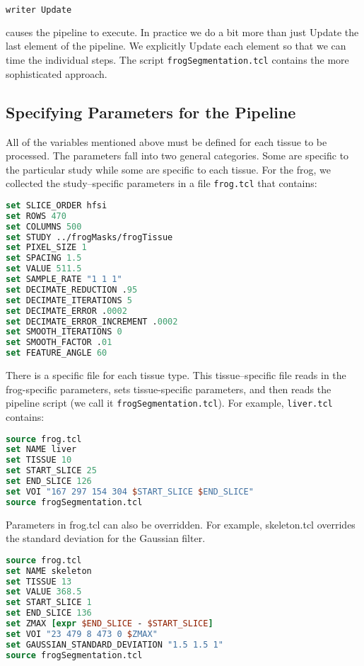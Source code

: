 \begin{lstlisting}[language=TCL, caption={}, numbers=none, frame=none]
writer Update
\end{lstlisting}

causes the pipeline to execute. In practice we do a bit more than just Update the last element of the pipeline. We explicitly Update each element so that we can time the individual steps. The script \texttt{frogSegmentation.tcl} contains the more sophisticated approach.

\subsection{Specifying Parameters for the Pipeline}

All of the variables mentioned above must be defined for each tissue
to be processed. The parameters fall into two general categories. Some are specific to the particular study while some are specific to each tissue. For the frog, we collected the study--specific parameters in a file \texttt{frog.tcl} that contains:

\begin{lstlisting}[language=TCL, caption={Specifying Parameters for the Pipeline.}]
set SLICE_ORDER hfsi
set ROWS 470
set COLUMNS 500
set STUDY ../frogMasks/frogTissue
set PIXEL_SIZE 1
set SPACING 1.5
set VALUE 511.5
set SAMPLE_RATE "1 1 1"
set DECIMATE_REDUCTION .95
set DECIMATE_ITERATIONS 5
set DECIMATE_ERROR .0002
set DECIMATE_ERROR_INCREMENT .0002
set SMOOTH_ITERATIONS 0
set SMOOTH_FACTOR .01
set FEATURE_ANGLE 60
\end{lstlisting}

There is a specific file for each tissue type. This tissue--specific file reads in the frog-specific parameters, sets tissue-specific parameters, and then reads the pipeline script (we call it  \texttt{frogSegmentation.tcl}). For example, \texttt{liver.tcl} contains:

\begin{lstlisting}[language=TCL, caption={Tissue specific file.}]
source frog.tcl
set NAME liver
set TISSUE 10
set START_SLICE 25
set END_SLICE 126
set VOI "167 297 154 304 $START_SLICE $END_SLICE"
source frogSegmentation.tcl
\end{lstlisting}

Parameters in frog.tcl can also be overridden. For example, skeleton.tcl overrides the standard deviation for the Gaussian filter.

\begin{lstlisting}[language=TCL, caption={Overriding parameters.}]
source frog.tcl
set NAME skeleton
set TISSUE 13
set VALUE 368.5
set START_SLICE 1
set END_SLICE 136
set ZMAX [expr $END_SLICE - $START_SLICE]
set VOI "23 479 8 473 0 $ZMAX"
set GAUSSIAN_STANDARD_DEVIATION "1.5 1.5 1"
source frogSegmentation.tcl
\end{lstlisting}

